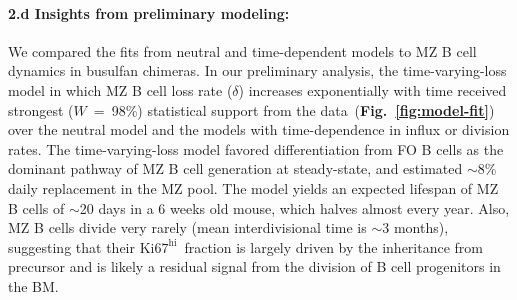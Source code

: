 \documentclass[11pt]{article}
\newcommand{\khi}{\ensuremath{\text{Ki67}^\text{hi}}~}
\newcommand{\para}[1]{\vspace*{-4.5mm}\paragraph{#1}}
\begin{document}
\para{{2.d Insights from preliminary modeling:}}
We compared the fits from neutral and time-dependent models to MZ B cell dynamics in busulfan chimeras.
In our preliminary analysis, the time-varying-loss model in which MZ B cell loss rate ($\delta$) increases exponentially with time received strongest ($W$~=~98\%) statistical support from the data~(\textbf{Fig.~\ref{fig:model-fit}})  over the neutral model and the models with time-dependence in influx or division rates.
The time-varying-loss model favored differentiation from FO B cells as the dominant pathway of MZ B cell generation at steady-state, and estimated $\sim$8\% daily replacement in the MZ pool.
The model yields an expected lifespan of MZ B cells of $\sim$20 days in a 6 weeks old mouse, which halves almost every year.
Also, MZ B cells divide very rarely  (mean interdivisional time is $\sim$3 months), suggesting that their \khi fraction is largely driven by the inheritance from precursor and is likely a residual signal from the division of B cell progenitors in the BM. 

\end{document}
